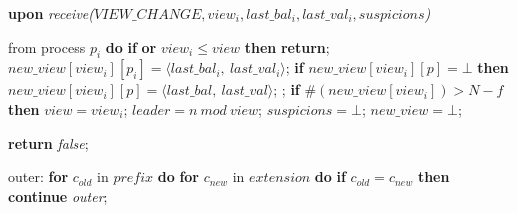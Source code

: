 \begin{algorithm}
\begin{algorithmic}[1]
		\State\textbf{upon} \textit{receive($VIEW\_CHANGE, view_i, last\_bal_i, last\_val_i, suspicions$)} 
		\item[] from process $p_i$ \textbf{do} 
		\State\hspace{\algorithmicindent} \textbf{if}  \textbf{or} $view_i \leq view$ \textbf{then}
		\State\hspace{\algorithmicindent}\hspace{\algorithmicindent}\textbf{return};
		\State
		\State\hspace{\algorithmicindent} $new\_view[view_i][p_i] = \langle last\_bal_i,\ last\_val_i \rangle$;
		\State\hspace{\algorithmicindent} \textbf{if} $new\_view[view_i][p] = \bot$ \textbf{then}
		\State\hspace{\algorithmicindent}\hspace{\algorithmicindent} $new\_view[view_i][p] = \langle last\_bal,\ last\_val \rangle$;
		\State\hspace{\algorithmicindent}\hspace{\algorithmicindent}  ;
		\State
		\State\hspace{\algorithmicindent} \textbf{if} $\#(new\_view[view_i]) > N-f$ \textbf{then}
		\State\hspace{\algorithmicindent}\hspace{\algorithmicindent} $view = view_i$;
		\State\hspace{\algorithmicindent}\hspace{\algorithmicindent} $leader = n\ mod\ view$;
		\State\hspace{\algorithmicindent}\hspace{\algorithmicindent} $suspicions = \bot$;
		\State\hspace{\algorithmicindent}\hspace{\algorithmicindent} $new\_view = \bot$;

		\iffalse\State
		\State \textbf{return} \textit{false};
		\EndIf
		
		\State
		\item[] outer:	
		\State \textbf{for} $c_{old}$ in $prefix$ \textbf{do}
		\State \hspace{\algorithmicindent} \textbf{for} $c_{new}$ in $extension$ \textbf{do}
		\State\hspace{\algorithmicindent}\hspace{\algorithmicindent} \textbf{if} $c_{old} = c_{new}$ \textbf{then}
		\State \hspace{\algorithmicindent}\hspace{\algorithmicindent}\hspace{\algorithmicindent} \textbf{continue} \textit{outer};
		

\end{algorithmic}
\end{algorithm}
